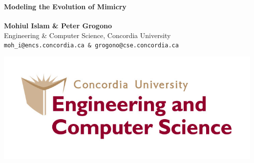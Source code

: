 \documentclass[a0,portrait]{a0poster}
\begin{document}


\begin{minipage}[b]{0.75\linewidth}
\veryHuge \color{NavyBlue} \textbf{Modeling the Evolution of Mimicry} \color{Black}\\\\ %
\huge \textbf{Mohiul Islam \& Peter Grogono}\\[0.5cm] %
\huge Engineering \& Computer Science, Concordia University\\[0.4cm] %
\Large \texttt{moh\_i@encs.concordia.ca \& grogono@cse.concordia.ca}\\
\end{minipage}
%
\begin{minipage}[b]{0.25\linewidth}
\includegraphics[width=20cm]{logo.jpg}\\
\end{minipage}

\vspace{1cm} %

\end{document}
